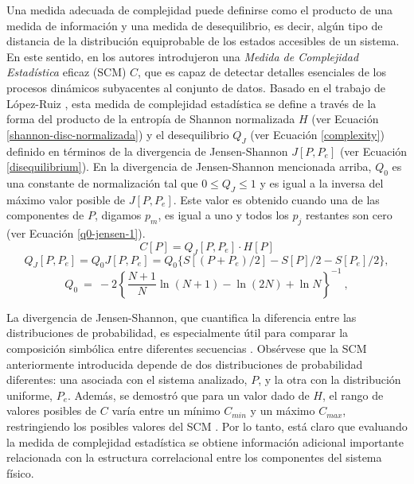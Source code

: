 Una medida adecuada de complejidad puede definirse como el producto de una medida de información y una medida de desequilibrio, es decir, algún tipo de distancia de la distribución equiprobable de los estados accesibles de un sistema.
En este sentido, en \cite{Lamberti2004} los autores introdujeron una {\it Medida de Complejidad Estadística \/} eficaz (SCM) $C$, que es capaz de detectar detalles esenciales de los procesos dinámicos subyacentes al conjunto de datos.
Basado en el trabajo de López-Ruiz \cite{Lopez1995}, esta medida de complejidad estadística \cite{Martin2003,Lamberti2004} se define a través de la forma del producto de la entropía de Shannon normalizada $H$ (ver Ecuación \eqref{shannon-disc-normalizada}) y el desequilibrio $Q_{J}$ (ver Ecuación \ref{complexity}) definido en términos de la divergencia de Jensen-Shannon $J[P, P_e]$ (ver Ecuación \ref{disequilibrium}). En la divergencia de Jensen-Shannon mencionada arriba, $Q_0$ es una constante de normalización tal que $0 \leq Q_{J} \leq 1$ y es igual a la inversa del máximo valor posible de $J [P,P_e]$.
Este valor es obtenido cuando una de las componentes de $P$, digamos $p_m$, es igual a uno y todos los $p_j$ restantes son cero (ver Ecuación \ref{q0-jensen-1}).
\begin{equation}
C[P] = Q_{J}[P,P_e] \cdot H[P]
\label{complexity}
\end{equation}
\begin{equation}
\label{disequilibrium}	
Q_{J} [ P, P_e] = Q_{0} J[ P, P_e] = Q_{0} \{ S[(P + P_e)/2 ] - S[ P ]/2 - S[P_e]/2\},
\end{equation}
\begin{equation}
Q_0 ~=~ -2 \left\{ {\frac{N+1}{N}} \ln (N+1) - \ln (2N) + \ln N \right\}^{-1} \ ,
\label{q0-jensen-1}
\end{equation}

La divergencia de Jensen-Shannon, que cuantifica la diferencia entre las distribuciones de probabilidad, es especialmente útil para comparar la composición simbólica entre diferentes secuencias \cite{Grosse2002}.
Obsérvese que la SCM anteriormente introducida depende de dos distribuciones de probabilidad diferentes: una asociada con el sistema analizado, $P$, y la otra con la distribución uniforme, $P_e$.
Además, se demostró que para un valor dado de $H$, el rango de valores posibles de $C$ varía entre un mínimo $C_ {min}$ y un máximo $C_ {max}$, restringiendo los posibles valores del SCM \cite{Martin2006}.
Por lo tanto, está claro que evaluando la medida de complejidad estadística se obtiene información adicional importante relacionada con la estructura correlacional entre los componentes del sistema físico.

